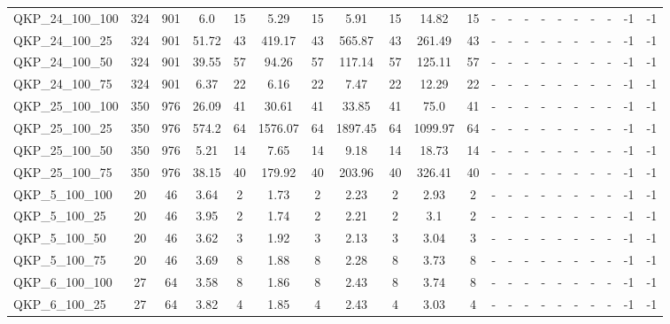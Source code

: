 \begin{sidewaystable}[!ht]
{\begin{tabular}{lcccccccccccccccccccc}
QKP\_24\_100\_100 & 324 & 901 & 6.0 & 15 &  \textcolor{blue2}{5.29} & 15 & 5.91 & 15 & 14.82 & 15 &  - &  - &  - &  - &  - &  - &  - &  - & -1 & -1 \\
QKP\_24\_100\_25 & 324 & 901 &  \textcolor{blue2}{51.72} & 43 & 419.17 & 43 & 565.87 & 43 & 261.49 & 43 &  - &  - &  - &  - &  - &  - &  - &  - & -1 & -1 \\
QKP\_24\_100\_50 & 324 & 901 &  \textcolor{blue2}{39.55} & 57 & 94.26 & 57 & 117.14 & 57 & 125.11 & 57 &  - &  - &  - &  - &  - &  - &  - &  - & -1 & -1 \\
QKP\_24\_100\_75 & 324 & 901 & 6.37 & 22 &  \textcolor{blue2}{6.16} & 22 & 7.47 & 22 & 12.29 & 22 &  - &  - &  - &  - &  - &  - &  - &  - & -1 & -1 \\
QKP\_25\_100\_100 & 350 & 976 &  \textcolor{blue2}{26.09} & 41 & 30.61 & 41 & 33.85 & 41 & 75.0 & 41 &  - &  - &  - &  - &  - &  - &  - &  - & -1 & -1 \\
QKP\_25\_100\_25 & 350 & 976 &  \textcolor{blue2}{574.2} & 64 & 1576.07 & 64 & 1897.45 & 64 & 1099.97 & 64 &  - &  - &  - &  - &  - &  - &  - &  - & -1 & -1 \\
QKP\_25\_100\_50 & 350 & 976 &  \textcolor{blue2}{5.21} & 14 & 7.65 & 14 & 9.18 & 14 & 18.73 & 14 &  - &  - &  - &  - &  - &  - &  - &  - & -1 & -1 \\
QKP\_25\_100\_75 & 350 & 976 &  \textcolor{blue2}{38.15} & 40 & 179.92 & 40 & 203.96 & 40 & 326.41 & 40 &  - &  - &  - &  - &  - &  - &  - &  - & -1 & -1 \\
QKP\_5\_100\_100 & 20 & 46 & 3.64 & 2 &  \textcolor{blue2}{1.73} & 2 & 2.23 & 2 & 2.93 & 2 &  - &  - &  - &  - &  - &  - &  - &  - & -1 & -1 \\
QKP\_5\_100\_25 & 20 & 46 & 3.95 & 2 &  \textcolor{blue2}{1.74} & 2 & 2.21 & 2 & 3.1 & 2 &  - &  - &  - &  - &  - &  - &  - &  - & -1 & -1 \\
QKP\_5\_100\_50 & 20 & 46 & 3.62 & 3 &  \textcolor{blue2}{1.92} & 3 & 2.13 & 3 & 3.04 & 3 &  - &  - &  - &  - &  - &  - &  - &  - & -1 & -1 \\
QKP\_5\_100\_75 & 20 & 46 & 3.69 & 8 &  \textcolor{blue2}{1.88} & 8 & 2.28 & 8 & 3.73 & 8 &  - &  - &  - &  - &  - &  - &  - &  - & -1 & -1 \\
QKP\_6\_100\_100 & 27 & 64 & 3.58 & 8 &  \textcolor{blue2}{1.86} & 8 & 2.43 & 8 & 3.74 & 8 &  - &  - &  - &  - &  - &  - &  - &  - & -1 & -1 \\
QKP\_6\_100\_25 & 27 & 64 & 3.82 & 4 &  \textcolor{blue2}{1.85} & 4 & 2.43 & 4 & 3.03 & 4 &  - &  - &  - &  - &  - &  - &  - &  - & -1 & -1 \\

\end{tabular}}
\end{sidewaystable}
